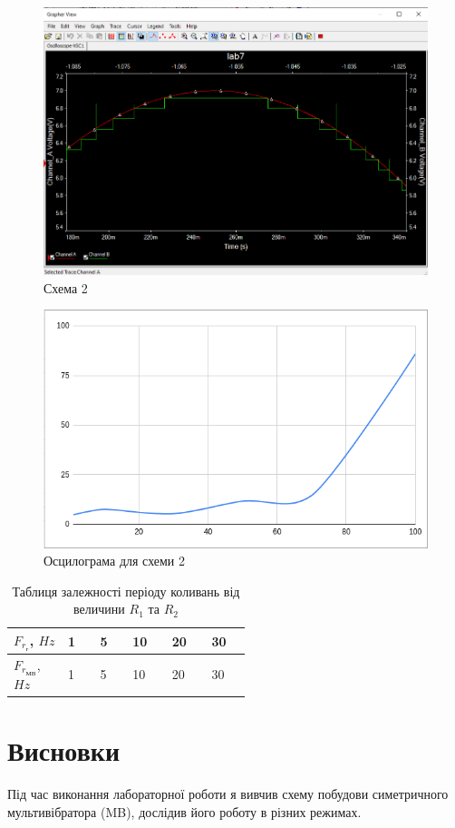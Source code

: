 \documentclass{article}
\begin{document}
\begin{normalsize}
	\begin{figure}[H]
		\centering
		\includegraphics[width=\textwidth]{3}
		\caption{Схема 2}
	\end{figure}
	
	\begin{figure}[H]
		\centering
		\includegraphics[width=\textwidth]{4}
		\caption{Осцилограма для схеми 2}
	\end{figure}
	
	\begin{table}[H]
		\centering
		\renewcommand*\arraystretch{1.3}
		\begin{tabular}{|p{0.12\linewidth}|p{0.08\linewidth}|p{0.08\linewidth}|p{0.08\linewidth}|p{0.08\linewidth}|p{0.08\linewidth}|}
			\hline
			$F_{r_{\text{г}}}$, $Hz$&1&5&10&20&30\\
			\hline
			$F_{r_{\text{МВ}}}$, $Hz$&1&5&10&20&30\\
			\hline
		\end{tabular}
		\caption{Таблиця залежності періоду коливань від величини $R_1$ та $R_2$}
	\end{table}
	
	\section*{Висновки}
	Під час виконання лабораторної роботи я вивчив схему побудови симетричного мультивібратора
	(MB), дослідив його роботу в різних режимах.
	    
\end{normalsize}
\end{document}
